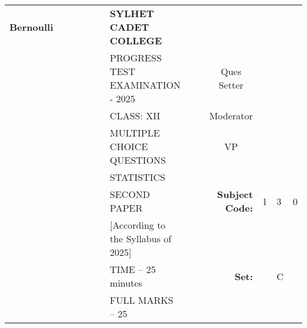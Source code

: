 \documentclass[12pt]{exam}
\begin{document}
\begin{table}[]
\begin{tabular}{lllllllllrlll}
\textbf{Bernoulli} &  &  &  &  &  & \textbf{SYLHET CADET COLLEGE}       &  &                       & \multicolumn{1}{l}{}                        &                        &                        &                        \\ \cline{10-13} 
       &  &  &  &  &  & PROGRESS TEST EXAMINATION - 2025             &  & \multicolumn{1}{l|}{} & \multicolumn{1}{c|}{Ques Setter}            & \multicolumn{3}{l|}{}                                                    \\ \cline{10-13} 
       &  &  &  &  &  & CLASS: XII                          &  & \multicolumn{1}{l|}{} & \multicolumn{1}{c|}{Moderator}              & \multicolumn{3}{l|}{}                                                    \\ \cline{10-13} 
       &  &  &  &  &  & MULTIPLE CHOICE QUESTIONS           &  & \multicolumn{1}{l|}{} & \multicolumn{1}{c|}{VP}                     & \multicolumn{3}{l|}{}                                                    \\ \cline{10-13} 
       &  &  &  &  &  & STATISTICS                          &  &                       &                                             &                        &                        &                        \\ \cline{11-13} 
       &  &  &  &  &  & SECOND PAPER                        &  &                       & \multicolumn{1}{r|}{\textbf{Subject Code:}} & \multicolumn{1}{l|}{1} & \multicolumn{1}{l|}{3} & \multicolumn{1}{l|}{0} \\ \cline{11-13} 
       &  &  &  &  &  & [According to the Syllabus of 2025] &  &                       &                                             &                        &                        &                        \\ \cline{12-12}
       &  &  &  &  &  & TIME – 25 minutes                   &  &                       & \textbf{Set:}                               & \multicolumn{1}{l|}{}  & \multicolumn{1}{l|}{C} &                        \\ \cline{12-12}
       &  &  &  &  &  & FULL MARKS – 25                     &  &                       & \multicolumn{1}{l}{}                        &                        &                        &                       
\end{tabular}
\end{table}
\end{document}
